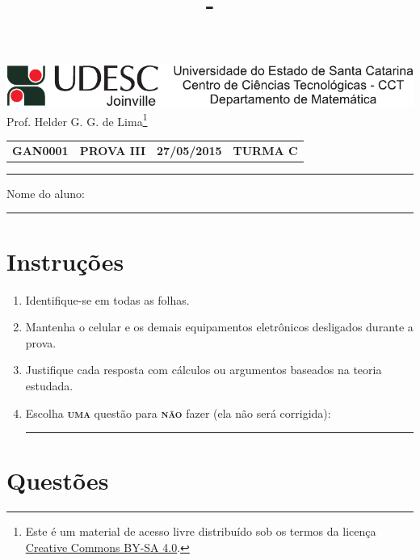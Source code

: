 \documentclass[12pt,a4paper]{article}
\author{\eu}
\title{\tipo - \disciplina}
\date{\data}
\newcommand*\tipo{PROVA III}
\newcommand*\turma{TURMA C}
\newcommand*\disciplina{GAN0001}
\newcommand*\eu{Helder G. G. de Lima}
\newcommand*\data{27/05/2015}
\begin{document}
\thispagestyle{empty}
\begin{center}
\includegraphics{udesc_joinville_cabecalho.pdf}
\\ Prof. \eu\footnote{
Este é um material de acesso livre distribuído sob os termos da licença \href{https://creativecommons.org/licenses/by-sa/4.0/deed.pt_BR}{Creative Commons BY-SA 4.0}.}

\noindent\begin{tabular}{l c c r}
  \textbf{\disciplina}
& \textbf{\tipo}
& \textbf{\data}
& \textbf{\turma}
\end{tabular}\vspace{-0.3cm}
\noindent\rule{17cm}{0.01cm}
\end{center}

\noindent Nome do aluno: \rule{14cm}{0.01cm}

\section*{Instruções}

\begin{enumerate}
\renewcommand{\theenumi}{\Roman{enumi}}
\item Identifique-se em todas as folhas.
\item Mantenha o celular e os demais equipamentos eletrônicos desligados durante a prova.
\item Justifique cada resposta com cálculos ou argumentos baseados na teoria estudada.
\item Escolha \textsc{\textbf{uma}} questão para \textsc{\textbf{não}} fazer (ela não será corrigida): \rule{3cm}{0.01cm}
\end{enumerate}

\section*{Questões}
\end{document}
